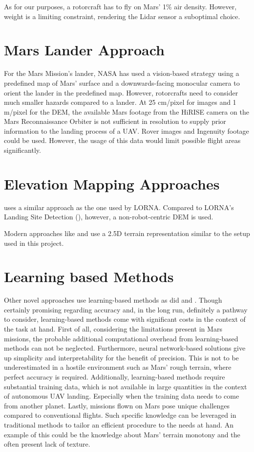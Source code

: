 As for our purposes, a rotorcraft has to fly on Mars' 1\% air density. However, weight is a limiting constraint, rendering the Lidar sensor a suboptimal choice.

\section{Mars Lander Approach}
For the Mars Mission's lander, NASA has used a vision-based strategy using a predefined map of Mars' surface and a downwards-facing monocular camera to orient the lander in the predefined map\citep{Johnson2020Mars2020}. However, rotorcrafts need to consider much smaller hazards compared to a lander. At 25 cm/pixel for images and 1 m/pixel for the DEM, the available Mars footage from the HiRISE camera on the Mars Reconnaissance Orbiter is not sufficient in resolution to supply prior information to the landing process of a UAV. Rover images and Ingenuity footage could be used. However, the usage of this data would limit possible flight areas significantly.


\section{Elevation Mapping Approaches}
\citep{Johnson2005VisionGuided} uses a similar approach as the one used by LORNA. Compared to LORNA's Landing Site Detection (\citep{LSD1,LSD2}), however, a non-robot-centric DEM is used. 

Modern approaches like \citep{Fankhauser2014RobotCentric, Forster2015Continuous} and \citep{Daftry2018Robust} use a 2.5D terrain representation similar to the setup used in this project.

\section{Learning based Methods}
Other novel approaches use learning-based methods as did \citep{Neves2024Multimodal, Abdollahzadeh2022SafeLandingZones} and \citep{TovanchePicon2024RealTimeSafeValidation}. Though certainly promising regarding accuracy and, in the long run, definitely a pathway to consider, learning-based methods come with significant costs in the context of the task at hand. First of all, considering the limitations present in Mars missions, the probable additional computational overhead from learning-based methods can not be neglected. Furthermore, neural network-based solutions give up simplicity and interpretability for the benefit of precision. This is not to be underestimated in a hostile environment such as Mars' rough terrain, where perfect accuracy is required. Additionally, learning-based methods require substantial training data, which is not available in large quantities in the context of autonomous UAV landing. Especially when the training data needs to come from another planet. Lastly, missions flown on Mars pose unique challenges compared to conventional flights. Such specific knowledge can be leveraged in traditional methods to tailor an efficient procedure to the needs at hand. An example of this could be the knowledge about Mars' terrain monotony and the often present lack of texture.